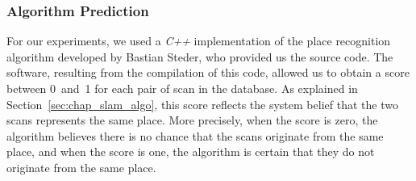 \begin{figure}[H]
    \centering
    \caption[todo]{}
    \label{fig:chap_slam_results_paths}
\end{figure}


\subsubsection{Algorithm Prediction}
For our experiments, we used a \textit{C++} implementation of the place recognition algorithm developed by Bastian Steder, who provided us the source code. The software, resulting from the compilation of this code, allowed us to obtain a score between 0~and~1 for each pair of scan in the database. As explained in Section~\ref{sec:chap_slam_algo}, this score reflects the system belief that the two scans represents the same place. More precisely, when the score is zero, the algorithm believes there is no chance that the scans originate from the same place, and when the score is one, the algorithm is certain that they do not originate from the same place.

